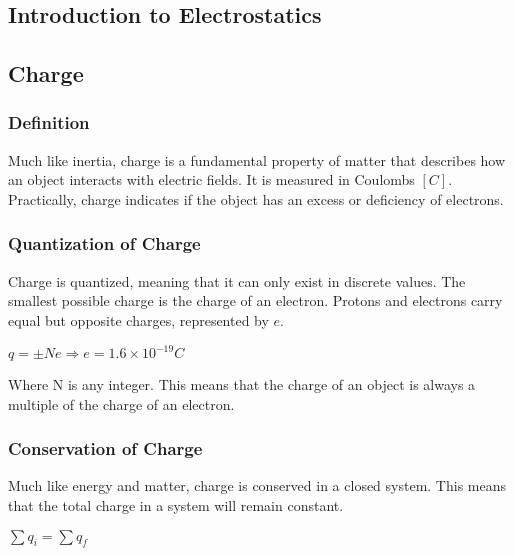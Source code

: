 \begin{center}
    \section{Introduction to Electrostatics}
    \hrulefill
    \subsection*{Charge}
\end{center}


\subsubsection*{Definition}

\hspace{.5cm}
Much like inertia, charge is a fundamental property of matter that describes how an object interacts with 
electric fields. It is measured in Coulombs $[C]$. Practically, charge indicates if the object has an excess 
or deficiency of electrons.

\subsubsection*{Quantization of Charge}
\hspace{.5cm}
Charge is quantized, meaning that it can only exist in discrete values. 
The smallest possible charge is the charge of an electron. Protons and electrons carry equal but opposite charges, 
represented by $e$.

\begin{center}
    $q = \pm Ne \Longrightarrow e = 1.6 \times 10^{-19}C$\\
\end{center}

Where N is any integer. This means that the charge of an object is always a multiple of the charge of an electron.

\subsubsection*{Conservation of Charge}

\hspace{.5cm}
Much like energy and matter, charge is conserved in a closed system. This means that the total charge in a system
will remain constant. 

\begin{center}
    $\sum q_i = \sum q_f$
\end{center}


